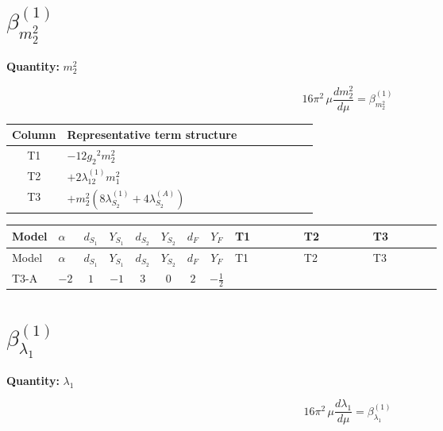 \documentclass[8pt]{article}
\begin{document}
\begin{landscape}
\section*{$\beta_{m_2^2}^{(1)}$}
\noindent\textbf{Quantity: }$m_2^2$\par\smallskip
\[16\pi^2\,\mu\frac{d m_2^2}{d\mu}=\beta_{m_2^2}^{(1)}\]
\begin{center}
\begin{tabular}{@{}c >{\raggedright\arraybackslash}p{0.82\linewidth}@{}}
\toprule
Column & Representative term structure \\
\midrule
T1 & \(\displaystyle -12 {g_2}^2 {m_2^2}\) \\
\midrule
T2 & \(\displaystyle +2 {\lambda_{12}^{(1)}} {m_1^2}\) \\
\midrule
T3 & \(\displaystyle +{m_2^2} (8 {\lambda_{S_2}^{(1)}}+4 {\lambda_{S_2}^{(A)}})\) \\
\midrule
\bottomrule
\end{tabular}
\end{center}
\smallskip
\tiny
\begin{longtable}{@{}llcccccc >{\raggedright\arraybackslash}p{0.21\linewidth} >{\raggedright\arraybackslash}p{0.21\linewidth} >{\raggedright\arraybackslash}p{0.21\linewidth}@{}}
\toprule
Model & $\alpha$ & $d_{S_1}$ & $Y_{S_1}$ & $d_{S_2}$ & $Y_{S_2}$ & $d_F$ & $Y_F$ & T1 & T2 & T3 \\
\midrule
\endfirsthead
\toprule
Model & $\alpha$ & $d_{S_1}$ & $Y_{S_1}$ & $d_{S_2}$ & $Y_{S_2}$ & $d_F$ & $Y_F$ & T1 & T2 & T3 \\
\midrule
\endhead
T3-A & $-2$ & $1$ & $-1$ & $3$ & $0$ & $2$ & $-\frac{1}{2}$ & \scriptsize\adjustbox{max width=\linewidth}{$\begin{gathered} -12 {g_2}^2 {m_2^2}\end{gathered}$} & \scriptsize\adjustbox{max width=\linewidth}{$\begin{gathered} +2 {\lambda_{12}^{(1)}} {m_1^2}\end{gathered}$} & \scriptsize\adjustbox{max width=\linewidth}{$\begin{gathered} +{m_2^2} (8 {\lambda_{S_2}^{(1)}}+4 {\lambda_{S_2}^{(A)}})\end{gathered}$} \\
\midrule
\bottomrule
\end{longtable}
\clearpage
\section*{$\beta_{\lambda_1}^{(1)}$}
\noindent\textbf{Quantity: }$\lambda_1$\par\smallskip
\[16\pi^2\,\mu\frac{d \lambda_1}{d\mu}=\beta_{\lambda_1}^{(1)}\]

\end{landscape}
\end{document}
